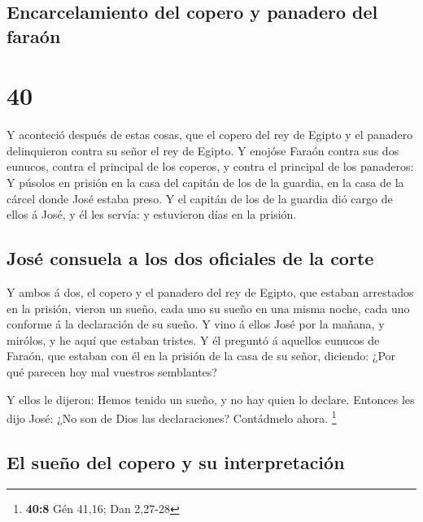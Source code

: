 \hypertarget{encarcelamiento-del-copero-y-panadero-del-farauxf3n}{%
\subsection{Encarcelamiento del copero y panadero del
faraón}\label{encarcelamiento-del-copero-y-panadero-del-farauxf3n}}

\hypertarget{section-39}{%
\section{40}\label{section-39}}

 Y aconteció después de estas cosas, que el copero del rey
de Egipto y el panadero delinquieron contra su señor el rey de Egipto.
 Y enojóse Faraón contra sus dos eunucos, contra el
principal de los coperos, y contra el principal de los panaderos:
 Y púsolos en prisión en la casa del capitán de los de la
guardia, en la casa de la cárcel donde José estaba preso. 
Y el capitán de los de la guardia dió cargo de ellos á José, y él les
servía: y estuvieron días en la prisión.

\hypertarget{josuxe9-consuela-a-los-dos-oficiales-de-la-corte}{%
\subsection{José consuela a los dos oficiales de la
corte}\label{josuxe9-consuela-a-los-dos-oficiales-de-la-corte}}

 Y ambos á dos, el copero y el panadero del rey de Egipto,
que estaban arrestados en la prisión, vieron un sueño, cada uno su sueño
en una misma noche, cada uno conforme á la declaración de su sueño.
 Y vino á ellos José por la mañana, y mirólos, y he aquí
que estaban tristes.  Y él preguntó á aquellos eunucos de
Faraón, que estaban con él en la prisión de la casa de su señor,
diciendo: ¿Por qué parecen hoy mal vuestros semblantes?

 Y ellos le dijeron: Hemos tenido un sueño, y no hay quien
lo declare. Entonces les dijo José: ¿No son de Dios las declaraciones?
Contádmelo ahora. \footnote{\textbf{40:8} Gén 41,16; Dan 2,27-28}

\hypertarget{el-sueuxf1o-del-copero-y-su-interpretaciuxf3n}{%
\subsection{El sueño del copero y su
interpretación}\label{el-sueuxf1o-del-copero-y-su-interpretaciuxf3n}}

